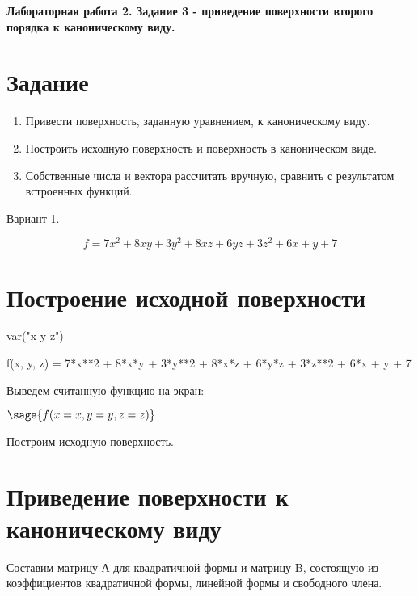 \documentclass{article}
\begin{document}
\begin{center}
\Large{\textbf{Лабораторная работа 2. Задание 3 - приведение поверхности второго порядка к каноническому виду.}}
\end{center}

\section{Задание}
\begin{enumerate}
\item Привести поверхность, заданную уравнением, к каноническому виду.
\item Построить исходную поверхность и поверхность в каноническом виде.
\item Собственные числа и вектора рассчитать вручную, сравнить с результатом встроенных функций.
\end{enumerate}

\begin{center}
Вариант 1. 
\end{center}
$$f = 7x^2 + 8xy + 3y^2 + 8xz + 6yz + 3z^2 + 6x + y + 7$$

\section{Построение исходной поверхности}
\begin{sagesilent}
var("x y z")
\end{sagesilent}
\begin{sageblock}
f(x, y, z) = 7*x**2 + 8*x*y + 3*y**2 + 8*x*z + 6*y*z + 3*z**2 + 6*x + y + 7
\end{sageblock}

Выведем считанную функцию на экран:

\begin{center}
$\sage{f(x=x, y=y, z=z)}$
\end{center}

Построим исходную поверхность.

\begin{center}
\end{center}

\section{Приведение поверхности к каноническому виду}
Составим матрицу А для квадратичной формы и матрицу B, состоящую из коэффициентов квадратичной формы, линейной формы и свободного члена.
\end{document}

